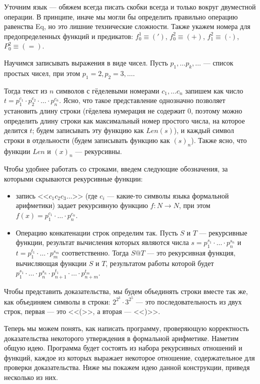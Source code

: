 Уточним язык --- обяжем всегда писать скобки всегда и только вокруг двуместной
операции. В принципе, иначе мы могли бы определить правильно операцию равенства Eq,
но это лишние технические сложности.
Также укажем номера для предопределенных функций и предикатов:
$f_0^1 \equiv (')$, $f_0^2 \equiv (+)$, $f_1^2 \equiv (\cdot)$, $P_0^2 \equiv (=)$.

Научимся записывать выражения в виде чисел. Пусть $p_1, \dots p_k, \dots$ --- список простых
чисел, при этом $p_1 = 2, p_2 = 3, \dots$. 

Тогда текст из $n$ символов с гёделевыми номерами $c_1, \dots c_n$ запишем как число
$t = p_1^{c_1} \cdot p_2^{c_2} \cdot \dots \cdot p_n^{c_n}$. Ясно, что такое представление
однозначно позволяет установить длину строки (гёделева нумерация не содержит 0, поэтому
можно определить длину строки как максимальный номер простого числа, на которое делится $t$;
будем записывать эту функцию как $\mathit{Len}(s)$),
и каждый символ строки в отдельности (будем записывать функцию как $(s)_n$).
Также ясно, что функции $\mathit{Len}$ и $(x)_n$ --- рекурсивны.

Чтобы удобнее работать со строками, введем следующие обозначения, за которыми скрываются
рекурсивные функции:

\begin{itemize}
\item запись $\texttt{<<}c_1 c_2 c_3 \dots \texttt{>>}$ (где $c_i$ --- какие-то символы языка формальной арифметики)
задает рекурсивную функцию $f: N \rightarrow N$, при этом $f(x) = p_1^{c_1} \cdot \dots \cdot p_n^{c_n}$.

\item Операцию конкатенации строк определим так. Пусть $S$ и $T$ --- рекурсивные функции,
результат вычисления которых являются числа $s = p_1^{s_1} \cdot \dots \cdot p_n^{s_n}$ и
$t = p_1^{t_1} \cdot \dots \cdot p_m^{s_m}$ соответственно. 
Тогда $S @ T$ --- это рекурсивная функция, вычисляющая функции $S$ и $T$, 
результатом работы которой будет
$p_1^{s_1} \cdot \dots \cdot p_n^{s_n} \cdot p_{n+1}^{t_1} \cdot \dots \cdot p_{n+m}^{t_m}$.

\end{itemize}

Чтобы представить доказательства, мы будем объединять строки вместе так же, как
объединяем символы в строки: $2^{2^3} \cdot 3^{2^5}$ --- это последовательность
из двух строк, первая --- это <<(>>, а вторая --- <<)>>.

Теперь мы можем понять, как написать программу, проверяющую корректность доказательства 
некоторого утверждения в формальной арифметике. Наметим общую идею. Программа будет состоять из набора
рекурсивных отношений и функций, каждое из которых выражает некоторое 
отношение, содержательное для проверки доказательства. Ниже мы покажем идею 
данной конструкции, приведя несколько из них.

